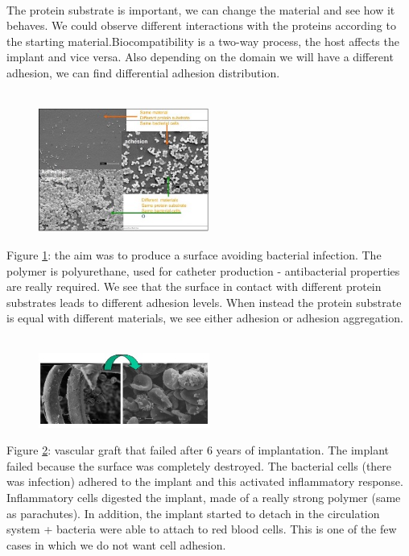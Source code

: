 \\
\noindent
The protein substrate is important, we can change the material and see how it behaves.
We could observe different interactions with the proteins according to the starting material.Biocompatibility is a two-way process, the host affects the implant and vice versa. Also depending on the domain we will have a different adhesion, we can find differential adhesion distribution.
\\
\\
\noindent
\begin{figure}[h]
\includegraphics[width=0.5\textwidth, center]{polyu}
\caption{\label{fig:polyu}}
\end{figure}
Figure \ref{fig:polyu}: the aim was to produce a surface avoiding bacterial infection. The polymer is polyurethane, used for catheter production - antibacterial properties are really required. 
We see that the surface in contact with different protein substrates leads to different adhesion levels. When instead the protein substrate is equal with different materials, we see either adhesion or adhesion aggregation. 
\\
\\
\noindent
\begin{figure}[h]
\includegraphics[width=0.5\textwidth, center]{vascular}
\caption{\label{fig:vascular}}
\end{figure}
Figure \ref{fig:vascular}: vascular graft that failed after 6 years of implantation. The implant failed because the surface was completely destroyed. The bacterial cells (there was infection) adhered to the implant and this activated inflammatory response. Inflammatory cells digested the implant, made of a really strong polymer (same as parachutes). In addition, the implant started to detach in the circulation system + bacteria were able to attach to red blood cells. This is one of the few cases in which we do not want cell adhesion.

